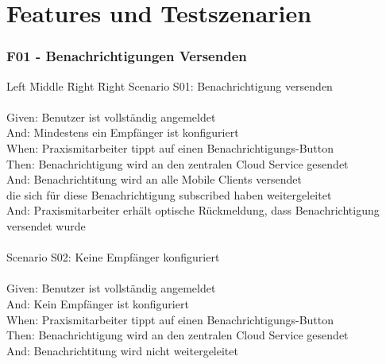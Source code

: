 
\section{Features und Testszenarien}

\subsubsection*{F01 - Benachrichtigungen Versenden}
\begin{tabbing}
    Left \= Middle \= Right \= Right \kill
    Scenario S01: \> \> \> Benachrichtigung versenden\\ \\
    Given:  \> \> \> Benutzer ist vollständig angemeldet\\
    And: \>    \> \> Mindestens ein Empfänger ist konfiguriert\\
    When:   \> \> \> Praxismitarbeiter tippt auf einen Benachrichtigungs-Button\\
    Then:   \> \> \> Benachrichtigung wird an den zentralen Cloud Service gesendet\\
    And: \>    \> \> Benachrichtitung wird an alle Mobile Clients versendet\\
    \> \>  \> die sich für diese Benachrichtigung subscribed haben weitergeleitet\\
    And:   \> \> \> Praxismitarbeiter erhält optische Rückmeldung, dass Benachrichtigung versendet wurde\\

    \\
    Scenario S02: \>  \> \> Keine Empfänger konfiguriert\\ \\
    Given:  \> \> \> Benutzer ist vollständig angemeldet\\
    And:  \> \>   \> Kein Empfänger ist konfiguriert\\
    When:  \> \>  \> Praxismitarbeiter tippt auf einen Benachrichtigungs-Button\\
    Then:  \> \>  \> Benachrichtigung wird an den zentralen Cloud Service gesendet\\
    And:  \> \>   \> Benachrichtitung wird nicht weitergeleitet\\

\end{tabbing}


